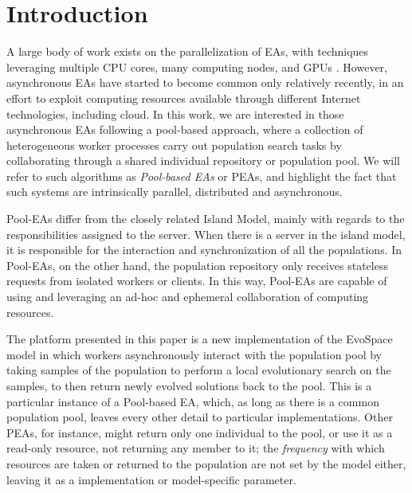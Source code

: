\section{Introduction}
A large body of work exists on the parallelization of EAs,
with techniques leveraging multiple CPU cores, many computing nodes, 
and GPUs \cite{muhlenbein1989parallel,cantu2000efficient,hofmann2013performance}. 
However, asynchronous EAs
\cite{Jini:FEA2000,alba2001analyzing,Jini:FEA2000,jj:2008:PPSN} have
started to become common only relatively
recently, in an effort to exploit computing resources available
through different Internet technologies, including cloud. In this work, we are
interested in those asynchronous EAs following a pool-based approach,
where a collection of heterogeneous worker processes 
carry out population search tasks by collaborating through a shared
individual 
repository or population pool. We will refer to such algorithms 
as {\em Pool-based EAs} or PEAs, and highlight the fact that 
such systems are intrinsically parallel, distributed and asynchronous.

Pool-EAs differ from the closely related Island Model, 
mainly with regards to the responsibilities assigned to 
the server. When there is a server in the island model, it is 
responsible for the interaction and synchronization of 
all the populations.  In Pool-EAs, on the other hand, the population repository only 
receives stateless requests from isolated workers 
or clients. In this way, Pool-EAs are capable of using and leveraging an 
ad-hoc and ephemeral collaboration of computing resources. 

The platform presented in this paper is a new implementation 
of the EvoSpace model \cite{GValdez2015} in which 
workers asynchronously interact with the population 
pool by taking samples of the population 
to perform a local evolutionary search on the samples, 
to then return newly evolved solutions back to the pool. This is a
particular instance of a Pool-based EA, which, as long as there is a
common population pool, leaves every other detail to particular
implementations. Other PEAs, for instance, might return only one
individual to the pool, or use it as a read-only resource, not
returning any member to it; the {\em frequency} with which resources
are taken or returned to the population are not set by the model
either, leaving it as a implementation or model-specific parameter. %


